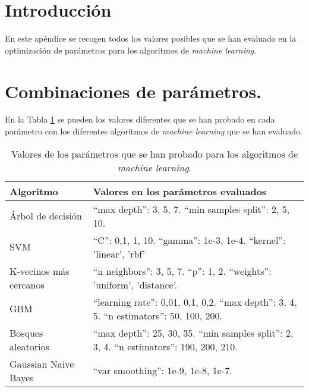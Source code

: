 \section{Introducción}
En este apéndice se recogen todos los valores posibles que se han evaluado en la optimización de parámetros para los algoritmos de \textit{machine learning}.


\section{Combinaciones de parámetros.}
\label{combinaciones-parametros}
En la Tabla \ref{table:combinaciones-parametros} se pueden los valores diferentes que se han probado en cada parámetro con los diferentes algoritmos de \textit{machine learning} que se han evaluado.

\begin{table}[]
    \centering
    \begin{tabularx}{\textwidth}{|l|>{\raggedright\arraybackslash}X|}
        \hline
        \rowcolor[HTML]{C0C0C0}
        Algoritmo              & Valores en los parámetros evaluados                                  \\ \hline
        Árbol de decisión      & ``max depth'': 3, 5, 7. ``min samples split'': 2, 5, 10.                          \\ \hline
        SVM                    & ``C'': 0,1, 1, 10. ``gamma'': 1e-3, 1e-4. ``kernel'': 'linear', 'rbf'                         \\ \hline
        K-vecinos más cercanos & ``n neighbors'': 3, 5, 7. ``p'': 1, 2. ``weights'': 'uniform', 'distance'.                     \\ \hline
        GBM                    & ``learning rate'': 0,01, 0,1, 0,2. ``max depth'': 3, 4, 5. ``n estimators'': 50, 100, 200.         \\ \hline
        Bosques aleatorios     & ``max depth'': 25, 30, 35. ``min samples split'': 2, 3, 4. ``n estimators'': 190, 200, 210.     \\ \hline
        Gaussian Naive Bayes   & ``var smoothing'': 1e-9, 1e-8, 1e-7.                                       \\ \hline
    \end{tabularx}
    \caption{Valores de los parámetros que se han probado para los algoritmos de \textit{machine learning}.}
    \label{table:combinaciones-parametros}
\end{table}